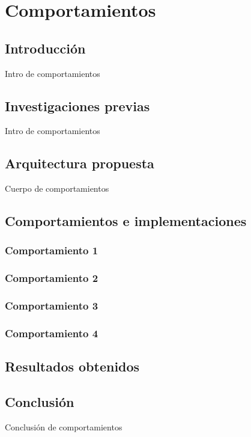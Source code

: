 \section{Comportamientos}

\subsection{Introducci\'on}
Intro de comportamientos

\subsection{Investigaciones previas}
Intro de comportamientos

\subsection{Arquitectura propuesta}
Cuerpo de comportamientos

\subsection{Comportamientos e implementaciones}

\subsubsection{Comportamiento 1}

\subsubsection{Comportamiento 2}

\subsubsection{Comportamiento 3}

\subsubsection{Comportamiento 4}

\subsection{Resultados obtenidos}

\subsection{Conclusi\'on}
Conclusi\'on de comportamientos

